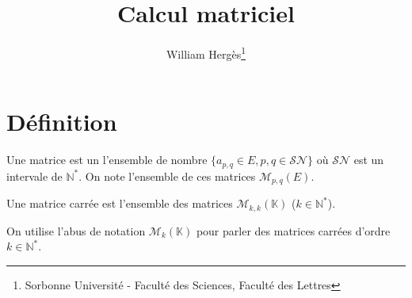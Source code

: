 \documentclass[a4paper, titlepage]{article}
\title{Calcul matriciel}
\author{William Hergès\thanks{Sorbonne Université - Faculté des Sciences, Faculté des Lettres}}
\begin{document}
	\maketitle
	\tableofcontents
	\newpage
	\section{Définition}
	\begin{defn}
		Une matrice est un l'ensemble de nombre $\{a_{p,q}\in E, p,q\in \mathcal{SN}\}$ où $\mathcal{SN}$ est un intervale de $\mathbb{N}^*$. On note l'ensemble de ces matrices $\mathcal{M}_{p,q}(E)$.
	\end{defn}
	\begin{defn}
		Une matrice carrée est l'ensemble des matrices $\mathcal{M}_{k,k}(\mathbb{K})$ ($k\in\mathbb{N}^*$).

		On utilise l'abus de notation $\mathcal{M}_k(\mathbb{K})$ pour parler des matrices carrées d'ordre $k\in\mathbb{N}^*$.
	\end{defn}
\end{document}
